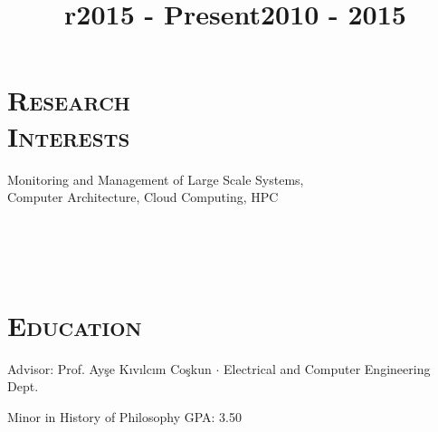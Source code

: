 
\hypersetup{backref,pdfpagemode=Full,colorlinks=true,backref}

\addtolength{\oddsidemargin}{-0.45in}
\addtolength{\voffset}{-0.30in}
\addtolength{\textwidth}{1.00in} \addtolength{\textheight}{1.50in}

\renewcommand{\namefont}{\LARGE\emph}

\def\Cplusplus{{\rm C\raise.25ex\hbox{\small ++}}}




\address{
}
\address{
	+1 857 540 8435 \hphantom{Apt. 2 Brookline M}
  \href{mailto:ates@bu.edu}{ates@bu.edu} 
}

\begin{resume}
	
	\section{\textsc{Research\\Interests}}
	Monitoring and Management of Large Scale Systems, \\
  Computer Architecture, Cloud Computing, HPC 
	
	\begin{formatb}
		\title{r}\\
		\\
		\body\\
	\end{formatb}
	
	\section{\textsc{Education}}
	
	\title{2015 - Present}
	\begin{position}
		Advisor: Prof. Ay\c{s}e K{\i}v{\i}lc{\i}m Co\c{s}kun $\cdot$ Electrical and
    Computer Engineering Dept. 
	\end{position}
	
	\title{2010 - 2015}
	\begin{position} 
		Minor in History of Philosophy \hfill GPA: 3.50 \hspace{-2.5mm}
	\end{position}
	

\end{resume}
